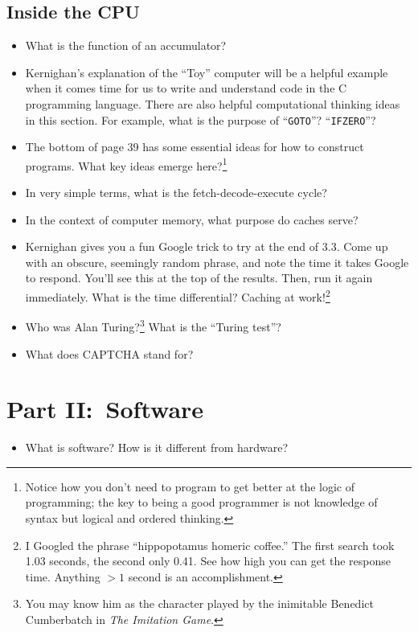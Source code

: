 \documentclass[12pt]{article}
\begin{document}
\subsection*{Inside the CPU}
\begin{itemize}
	\item What is the function of an accumulator?
	\item Kernighan's explanation of the ``Toy'' computer will be a helpful example when it comes time for us to write and understand code in the C programming language. There are also helpful computational thinking ideas in this section. For example, what is the purpose of ``\texttt{GOTO}''? ``\texttt{IFZERO}''?
	\item The bottom of page 39 has some essential ideas for how to construct programs. What key ideas emerge here?\footnote{Notice how you don't need to program to get better at the logic of programming; the key to being a good programmer is not knowledge of syntax but logical and ordered thinking.}
	\item In very simple terms, what is the fetch-decode-execute cycle?
	\item In the context of computer memory, what purpose do caches serve?
	\item Kernighan gives you a fun Google trick to try at the end of 3.3. Come up with an obscure, seemingly random phrase, and note the time it takes Google to respond. You'll see this at the top of the results. Then, run it again immediately. What is the time differential? Caching at work!\footnote{I Googled the phrase ``hippopotamus homeric coffee.'' The first search took 1.03 seconds, the second only 0.41. See how high you can get the response time. Anything $>1$ second is an accomplishment.}
	\item Who was Alan Turing?\footnote{You may know him as the character played by the inimitable Benedict Cumberbatch in \textit{The Imitation Game}.} What is the ``Turing test''?
	\item What does CAPTCHA stand for?
\end{itemize}

\hrulefill

\section*{Part II:\ Software}
\begin{itemize}
	\item What is software? How is it different from hardware?
\end{itemize}
\end{document}
